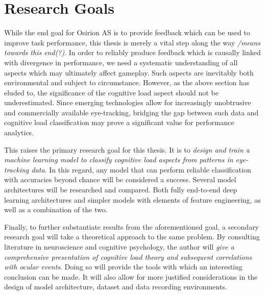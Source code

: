 \section{Research Goals} \label{sec:intro/research_goals}

While the end goal for Osirion AS is to provide feedback which can be used to improve task performance, this thesis is merely a vital step along the way \textit{/means towards this end(?)}. In order to reliably produce feedback which is causally linked with divergence in performance, we need a systematic understanding of all aspects which may ultimately affect gameplay. Such aspects are inevitably both environmental and subject to circumstance. However, as the above section has eluded to, the significance of the cognitive load aspect should not be underestimated. Since emerging technologies allow for increasingly unobtrusive and commercially available eye-tracking, bridging the gap between such data and cognitive load classification may prove a significant value for performance analytics.

This raises the primary research goal for this thesis. It is to \textit{design and train a machine learning model to classify cognitive load aspects from patterns in eye-tracking data}. In this regard, any model that can perform reliable classification with accuracies beyond chance will be considered a success. Several model architectures will be researched and compared. Both fully end-to-end deep learning architectures and simpler models with elements of feature engineering, as well as a combination of the two. %

Finally, to further substantiate results from the aforementioned goal, a secondary research goal will take a theoretical approach to the same problem. By consulting literature in neuroscience and cognitive psychology, the author will \textit{give a comprehensive presentation of cognitive load theory and subsequent correlations with ocular events}. Doing so will provide the tools with which an interesting conclusion can be made. It will also allow for more justified considerations in the design of model architecture, dataset and data recording environments.




